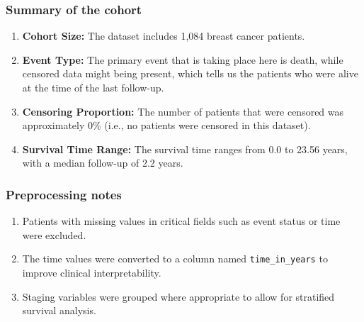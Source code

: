 \documentclass{article}
\providecommand{\tightlist}{%
  \setlength{\itemsep}{0pt}\setlength{\parskip}{0pt}}
\begin{document}
\subsubsection{Summary of the cohort}\label{summary-of-the-cohort}

\begin{enumerate}
\def\labelenumi{(\alph{enumi})}
\item
  \textbf{Cohort Size:} The dataset includes 1,084 breast cancer patients.
\item
  \textbf{Event Type:} The primary event that is taking place here is death, while censored data might being present, which tells us the patients who were alive at the time of the last follow-up.
\item
  \textbf{Censoring Proportion:} The number of patients that were censored was approximately 0\% (i.e., no patients were censored in this dataset).
\item
  \textbf{Survival Time Range:} The survival time ranges from 0.0 to 23.56 years, with a median follow-up of 2.2 years.
\end{enumerate}

\subsubsection{Preprocessing notes}\label{preprocessing-notes}

\begin{enumerate}
\def\labelenumi{(\alph{enumi})}
\tightlist
\item
  Patients with missing values in critical fields such as event status or time were excluded.\\
\item
  The time values were converted to a column named \texttt{time\_in\_years} to improve clinical interpretability.\\
\item
  Staging variables were grouped where appropriate to allow for stratified survival analysis.
\end{enumerate}
\end{document}
